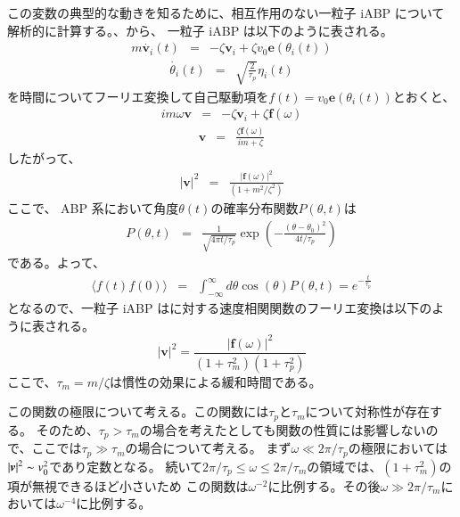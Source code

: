 \documentclass[/Users/ikedahajime/GitHub/reserch/master_report/thesis]{subfiles}
\begin{document}
この変数の典型的な動きを知るために、相互作用のない一粒子 iABP について解析的に計算する。、から、
一粒子 iABP は以下のように表される。
\begin{eqnarray}\label{eq:eom_iabp_single_1}
    m\dot{\bm{v}_i}(t)&=& - \zeta \bm{v}_i  +\zeta v_0 \bm{e}(\theta_i(t))
\end{eqnarray}
\begin{eqnarray}
    \dot{\theta_i }(t) &=& \sqrt{\frac{2}{\tau_p}}\eta_i(t)
\end{eqnarray}
を時間についてフーリエ変換して自己駆動項を$f(t)=v_0 \bm{e}(\theta_i(t))$とおくと、
\begin{eqnarray}
    im\omega\bm{v}&=&- \zeta \bm{v}_i  +\zeta \bm{f}(\omega)
\end{eqnarray}
\begin{eqnarray}
    \bm{v}&=&\frac{\zeta \bm{f}(\omega)}{im+\zeta}
\end{eqnarray}
したがって、
\begin{eqnarray}
    \left|\bm{v}\right|^2&=&\frac{|\bm{f}(\omega)|^2}{\left(1+m^2/\zeta^2\right)}
\end{eqnarray}
ここで、 ABP 系において角度$\theta(t)$の確率分布関数$P(\theta,t)$は
\begin{eqnarray}
    P(\theta,t)&=&\frac{1}{\sqrt{4\pi t/\tau_p}}\exp\left(-\frac{(\theta-\theta_0)^2}{4t/\tau_p}\right)
\end{eqnarray}
である。よって、
\begin{eqnarray}
    \langle f(t)f(0) \rangle&=&\int_{-\infty}^{\infty} d\theta \cos(\theta)P(\theta,t)=e^{-\frac{t}{\tau_p}}
\end{eqnarray}
となるので、一粒子 iABP はに対する速度相関関数のフーリエ変換は以下のように表される。
\begin{equation}\label{eq:intro_ft_about_iabp}
    \left|\bm{v}\right|^2=\frac{|\bm{f}(\omega)|^2}{\left(1+\tau_m^2\right)\left(1+\tau_p^2\right)}
\end{equation}
ここで、$\tau_m=m/\zeta$は慣性の効果による緩和時間である。

この関数の極限について考える。この関数には$\tau_p$と$\tau_m$について対称性が存在する。
そのため、$\tau_p>\tau_m$の場合を考えたとしても関数の性質には影響しないので、ここでは$\tau_p \gg  \tau_m$の場合について考える。
まず$\omega\ll 2\pi/\tau_p$の極限においては$\left|\bm{v}\right|^2 \thicksim v_0^2$であり定数となる。
続いて$2\pi/\tau_p \leq \omega \leq 2\pi/\tau_m$の領域では、$\left(1+\tau_m^2\right)$の項が無視できるほど小さいため
この関数は$\omega^{-2}$に比例する。その後$\omega \gg 2\pi/\tau_m$においては$\omega^{-4}$に比例する。
\end{document}
